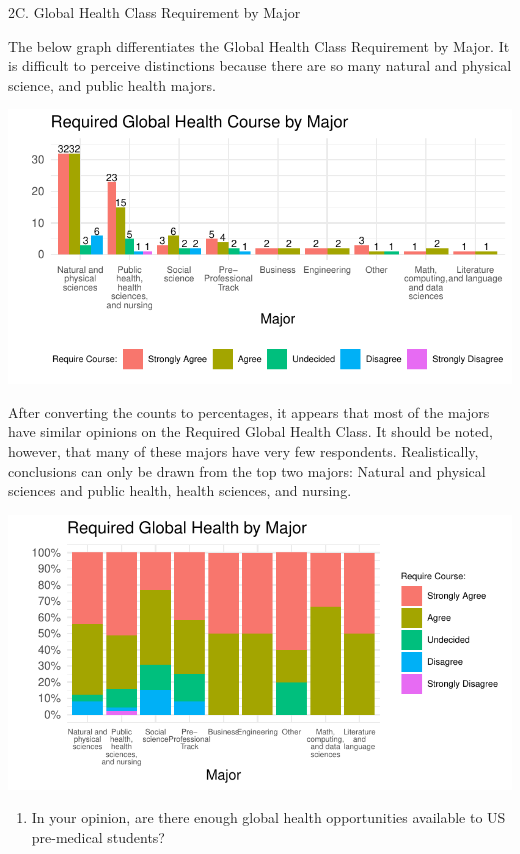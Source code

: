 \documentclass[
  letterpaper,
  DIV=11,
  numbers=noendperiod]{scrartcl}
\providecommand{\tightlist}{%
  \setlength{\itemsep}{0pt}\setlength{\parskip}{0pt}}\usepackage{longtable,booktabs,array}
\begin{document}
\newpage

2C. Global Health Class Requirement by Major

The below graph differentiates the Global Health Class Requirement by
Major. It is difficult to perceive distinctions because there are so
many natural and physical science, and public health majors.

\includegraphics{GlobalHealthQuartoHC_files/figure-pdf/unnamed-chunk-27-1.pdf}

After converting the counts to percentages, it appears that most of the
majors have similar opinions on the Required Global Health Class. It
should be noted, however, that many of these majors have very few
respondents. Realistically, conclusions can only be drawn from the top
two majors: Natural and physical sciences and public health, health
sciences, and nursing.

\includegraphics{GlobalHealthQuartoHC_files/figure-pdf/unnamed-chunk-28-1.pdf}

\begin{enumerate}
\def\labelenumi{\arabic{enumi}.}
\setcounter{enumi}{2}
\tightlist
\item
  In your opinion, are there enough global health opportunities
  available to US pre-medical students?
\end{enumerate}
\end{document}
